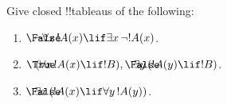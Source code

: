 \documentclass[../../../include/open-logic-section]{subfiles}
\begin{document}
\begin{prob}
Give closed !!{tableau}s of the following:
\begin{enumerate}
\item $\sFmla{\False}{\lnot\lforall[x][!A(x)] \lif \lexists[x][\lnot!A(x)]}$.
\item $\sFmla{\True}{(\lforall[x][!A(x)] \lif !B)}, \sFmla{\False}{\lexists[y][(!A(y) \lif !B)]}$.
\item $\sFmla{\False}{\lexists[x][(!A(x) \lif \lforall[y][!A(y)])]}$.
\end{enumerate}
\end{prob}
\end{document}
